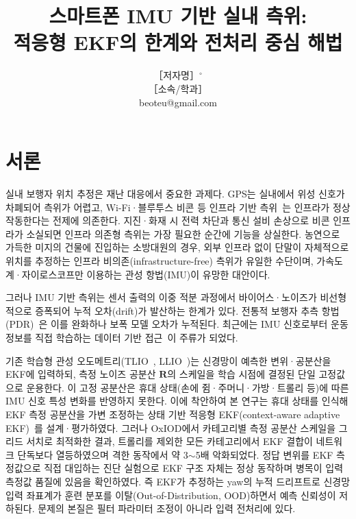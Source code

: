 \documentclass{kcc}
\title{스마트폰 IMU 기반 실내 측위:\\ 적응형 EKF의 한계와 전처리 중심 해법}
\author{
［저자명］$^{\circ}$\\
［소속/학과］ \\
beoteu@gmail.com
}
\begin{document}
\maketitle

\section{서론}
실내 보행자 위치 추정은 재난 대응에서 중요한 과제다. GPS는 실내에서 위성 신호가 차폐되어 측위가 어렵고, Wi-Fi·블루투스 비콘 등 인프라 기반 측위~\cite{radar}는 인프라가 정상 작동한다는 전제에 의존한다. 지진·화재 시 전력 차단과 통신 설비 손상으로 비콘 인프라가 소실되면 인프라 의존형 측위는 가장 필요한 순간에 기능을 상실한다. 농연으로 가득한 미지의 건물에 진입하는 소방대원의 경우, 외부 인프라 없이 단말이 자체적으로 위치를 추정하는 인프라 비의존(infrastructure-free) 측위가 유일한 수단이며, 가속도계·자이로스코프만 이용하는 관성 항법(IMU)이 유망한 대안이다.

그러나 IMU 기반 측위는 센서 출력의 이중 적분 과정에서 바이어스·노이즈가 비선형적으로 증폭되어 누적 오차(drift)가 발산하는 한계가 있다. 전통적 보행자 추측 항법(PDR)~\cite{harle}은 이를 완화하나 보폭 모델 오차가 누적된다. 최근에는 IMU 신호로부터 운동 정보를 직접 학습하는 데이터 기반 접근~\cite{ionet}이 주류가 되었다.

기존 학습형 관성 오도메트리(TLIO~\cite{tlio}, LLIO~\cite{llio})는 신경망이 예측한 변위·공분산을 EKF에 입력하되, 측정 노이즈 공분산 $\mathbf{R}$의 스케일을 학습 시점에 결정된 단일 고정값으로 운용한다. 이 고정 공분산은 휴대 상태(손에 쥠·주머니·가방·트롤리 등)에 따른 IMU 신호 특성 변화를 반영하지 못한다. 이에 착안하여 본 연구는 휴대 상태를 인식해 EKF 측정 공분산을 가변 조정하는 상태 기반 적응형 EKF(context-aware adaptive EKF)~\cite{akf}를 설계·평가하였다. 그러나 OxIOD에서 카테고리별 측정 공분산 스케일을 그리드 서치로 최적화한 결과, 트롤리를 제외한 모든 카테고리에서 EKF 결합이 네트워크 단독보다 열등하였으며 격한 동작에서 약 3$\sim$5배 악화되었다. 정답 변위를 EKF 측정값으로 직접 대입하는 진단 실험으로 EKF 구조 자체는 정상 동작하며 병목이 입력 측정값 품질에 있음을 확인하였다. 즉 EKF가 추정하는 yaw의 누적 드리프트로 신경망 입력 좌표계가 훈련 분포를 이탈(Out-of-Distribution, OOD)하면서 예측 신뢰성이 저하된다. 문제의 본질은 필터 파라미터 조정이 아니라 입력 전처리에 있다.
\end{document}
